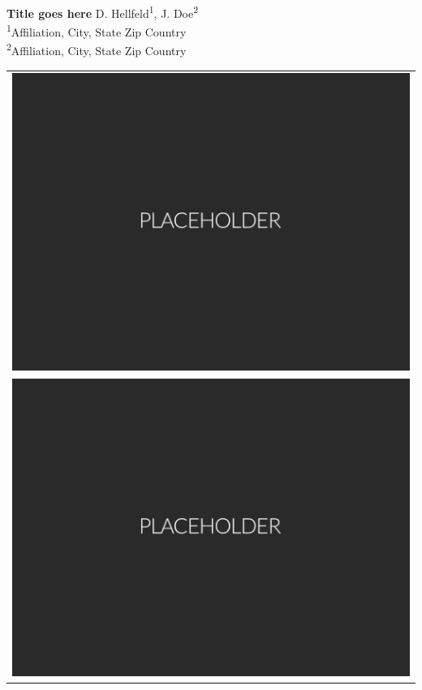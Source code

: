 \documentclass[a0paper,portrait]{baposter}
\begin{document}
\begin{poster}
{\begin{tabular}{c}
  \end{tabular}
}
{
\bf\LARGE{Title goes here}
}
%
{\vspace{0.6em}
  \large{D. Hellfeld\textsuperscript{1}, J. Doe\textsuperscript{2}} \\[0.4em]

  \small{\textsuperscript{1}Affiliation, City, State Zip Country \\[-0.2em]
             \textsuperscript{2}Affiliation, City, State Zip Country \\[-0.2em]}
}
{
  \begin{tabular}{c}
  \includegraphics[height=0.4\headerheight]{Figures/Placeholder.png} \\
  \includegraphics[height=0.4\headerheight]{Figures/Placeholder.png}
  \end{tabular}
}



\end{poster}
\end{document}

